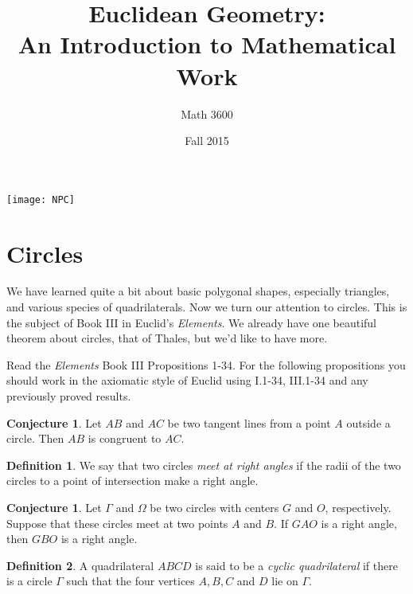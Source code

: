 \documentclass{tufte-handout}
\title{Euclidean Geometry:\\An Introduction to Mathematical Work}
\author[]{Math 3600}
\date{Fall 2015}
\theoremstyle{definition}
\newtheorem{conjecture}[problem]{Conjecture}
\newtheorem*{definition}{Definition}
\begin{document}
\maketitle

\begin{marginfigure}
    \texttt{[image: NPC]}
\end{marginfigure}

\setcounter{section}{9}
\section{Circles}

We have learned quite a bit about basic polygonal shapes, especially triangles, and various species of quadrilaterals. Now we turn our attention to circles. This is the subject of Book III in Euclid's \emph{Elements}. We already have one beautiful theorem about circles, that of Thales, but we'd like to have more.


Read the \emph{Elements} Book III Propositions 1-34. For the following propositions you should work in the axiomatic style of Euclid using I.1-34,  III.1-34 and any previously proved results.



\begin{conjecture}\label{conj:tangents-to-circle}
Let $AB$ and $AC$ be two tangent lines from a point $A$ outside a circle. Then $AB$ is congruent to $AC$.
\end{conjecture}

\begin{definition}\label{defn:circles-perp}
We say that two circles \emph{meet at right angles} if the radii of the two circles to a point of intersection make a right angle.
\end{definition}

\begin{conjecture}\label{conj:perp-circles}
Let $\Gamma$ and $\Omega$ be two circles with centers $G$ and $O$, respectively. Suppose that these circles meet at two points $A$ and $B$. If $GAO$ is a right angle, then $GBO$ is a right angle.
\end{conjecture}


\begin{definition}\label{defn:cyclic-quad}
A quadrilateral $ABCD$ is said to be a \emph{cyclic quadrilateral} if there is a circle $\Gamma$ such that the four vertices $A,B,C$ and $D$ lie on $\Gamma$.
\end{definition}
\end{document}
